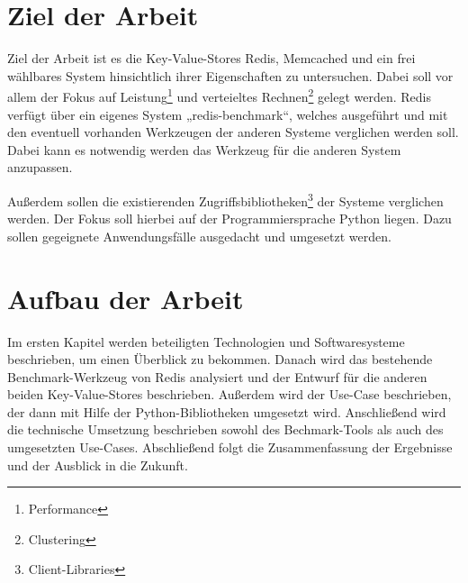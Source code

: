 \section{Ziel der Arbeit}

Ziel der Arbeit ist es die Key-Value-Stores Redis, Memcached und ein frei
wählbares System hinsichtlich ihrer Eigenschaften zu untersuchen. Dabei soll
vor allem der Fokus auf Leistung\footnote{Performance} und verteieltes
Rechnen\footnote{Clustering} gelegt werden. Redis verfügt über ein
eigenes System „redis-benchmark“, welches ausgeführt und mit den eventuell
vorhanden Werkzeugen der anderen Systeme verglichen werden soll. Dabei kann es
notwendig werden das Werkzeug für die anderen System anzupassen.

Außerdem sollen die existierenden
Zugriffsbibliotheken\footnote{Client-Libraries} der Systeme verglichen
werden. Der Fokus soll hierbei auf der Programmiersprache Python liegen. Dazu
sollen gegeignete Anwendungsfälle ausgedacht und umgesetzt werden.

\section{Aufbau der Arbeit}


Im ersten Kapitel werden beteiligten Technologien und Softwaresysteme
beschrieben, um einen Überblick zu bekommen. Danach wird das bestehende
Benchmark-Werkzeug von Redis analysiert und der Entwurf für die anderen beiden
Key-Value-Stores beschrieben. Außerdem wird der Use-Case beschrieben, der dann
mit Hilfe der Python-Bibliotheken umgesetzt wird. Anschließend wird die
technische Umsetzung beschrieben sowohl des Bechmark-Tools als auch des
umgesetzten Use-Cases. Abschließend folgt die Zusammenfassung der Ergebnisse
und der Ausblick in die Zukunft.
